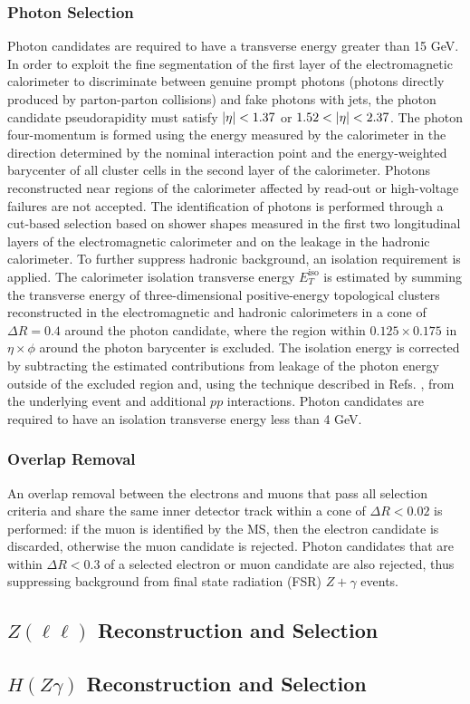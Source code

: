 \subsubsection*{Photon Selection}
Photon candidates are required to have a transverse energy greater than 15 GeV.
In order to exploit the fine segmentation of the first layer of the electromagnetic
calorimeter to discriminate between genuine prompt photons (photons directly produced
by parton-parton collisions) and fake photons with jets, the photon candidate 
pseudorapidity must satisfy $\abseta < 1.37$ or $1.52 < \abseta < 2.37$. The
photon four-momentum is formed using the energy measured by the calorimeter in the
direction determined by the nominal interaction point and the energy-weighted
barycenter of all cluster cells in the second layer of the calorimeter. Photons
reconstructed near regions of the calorimeter affected by read-out or high-voltage 
failures are not accepted. The identification of photons is performed through a
cut-based selection based on shower shapes measured in the first two longitudinal
layers of the electromagnetic calorimeter and on the leakage in the hadronic
calorimeter. To further suppress hadronic background, an isolation requirement is 
applied. The calorimeter isolation transverse energy $E_{T}^{\text{iso}}$ is
estimated by summing the transverse energy of three-dimensional positive-energy
topological clusters reconstructed in the electromagnetic and hadronic 
calorimeters in a cone of $\Delta R = 0.4$ around the photon candidate,
where the region within $0.125 \times 0.175$ in $\eta \times \phi$ around the
photon barycenter is excluded. The isolation energy is corrected by subtracting
the estimated contributions from leakage of the photon energy outside of the
excluded region and, using the technique described in 
Refs. \cite{Cacciari:2008gn, Cacciari:2009dp},
from the underlying event and additional $pp$ interactions. Photon candidates
are required to have an isolation transverse energy less than 4 GeV.

\subsubsection*{Overlap Removal}
An overlap removal between the electrons and muons that pass all selection
criteria and share the same inner detector track within a cone of $\Delta R < 0.02$
is performed: if the muon is identified by the MS, then the electron candidate is 
discarded, otherwise the muon candidate is rejected. Photon candidates that are
within $\Delta R < 0.3$ of a selected electron or muon candidate are also rejected,
thus suppressing background from final state radiation (FSR) $Z+\gamma$ events.

\subsection{$Z(\ell\ell)$ Reconstruction and Selection}
\subsection{$H(Z\gamma)$ Reconstruction and Selection}
